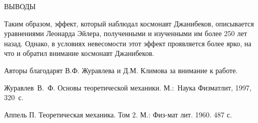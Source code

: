 \documentclass[14pt,a4paper]{extarticle}
\begin{document}
\newpage


{ВЫВОДЫ} 


\smallskip
Таким образом, эффект, который наблюдал космонавт Джанибеков, описывается уравнениями Леонарда Эйлера, полученными и изученными им более 250 лет назад. Однако, в условиях невесомости этот эффект проявляется более ярко, на что и обратил внимание космонавт Джанибеков. 


\smallskip

Авторы благодарят В.Ф. Журавлева и Д.М. Климова за внимание к работе.

\begin{thebibliography}{99}
 Журавлев~В.~Ф. Основы теоретической механики.
М.:~Наука Физматлит, 1997, 320~с.

 Аппель П. Теоретическая механика. Том 2. М.: Физ-мат лит. 1960. 487 с.
\end{thebibliography}
\end{document}
